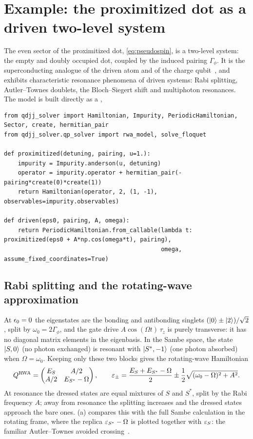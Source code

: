\chapter{Example: the proximitized dot as a driven two-level system}\label{ch:ex-tls}

The even sector of the proximitized dot, \cref{eq:pseudospin}, is a two-level system: the
empty and doubly occupied dot, coupled by the induced pairing $\Gamma_\phi$. It is the
superconducting analogue of the driven atom and of the charge
qubit~\cite{nakamura1999coherent,nakamura2001rabi,zazunov2003andreev,janvier2015coherent},
and exhibits characteristic resonance phenomena of driven systems: Rabi splitting,
Autler--Townes doublets, the Bloch--Siegert shift and multiphoton resonances. The model is
built directly as a ,

\begin{lstlisting}
from qdjj_solver import Hamiltonian, Impurity, PeriodicHamiltonian, Sector, create, hermitian_pair
from qdjj_solver.qp_solver import rwa_model, solve_floquet

def proximitized(detuning, pairing, u=1.):
    impurity = Impurity.anderson(u, detuning)
    operator = impurity.operator + hermitian_pair(-pairing*create(0)*create(1))
    return Hamiltonian(operator, 2, (1, -1), observables=impurity.observables)

def driven(eps0, pairing, A, omega):
    return PeriodicHamiltonian.from_callable(lambda t: proximitized(eps0 + A*np.cos(omega*t), pairing),
                                             omega, assume_fixed_coordinates=True)
\end{lstlisting}

\section{Rabi splitting and the rotating-wave approximation}

At $\epsilon_0=0$ the eigenstates are the bonding and antibonding singlets
$(\lvert 0\rangle\pm\lvert 2\rangle)/\sqrt2$, split by $\omega_0=2\Gamma_\phi$, and the gate drive
$A\cos(\Omega t)\,\tau_z$ is purely transverse: it has no diagonal matrix elements in the
eigenbasis. In the Sambe space, the state $\lvert S,0\rangle$ (no photon exchanged) is resonant with
$\lvert S^*,-1\rangle$ (one photon absorbed) when $\Omega=\omega_0$. Keeping only these two blocks
gives the rotating-wave Hamiltonian
\begin{equation}
  Q^{\mathrm{RWA}}=\begin{pmatrix} E_S & A/2\\ A/2 & E_{S^*}-\Omega\end{pmatrix},
  \qquad \varepsilon_\pm=\frac{E_S+E_{S^*}-\Omega}2\pm\frac12\sqrt{(\omega_0-\Omega)^2+A^2}.
\end{equation}
At resonance the dressed states are equal mixtures of $S$ and $S^*$, split by the Rabi
frequency $A$; away from resonance the splitting increases and the dressed states approach the bare
ones. (a) compares this with the full Sambe calculation in the rotating
frame, where the replica $\varepsilon_{S^*}-\Omega$ is plotted together with $\varepsilon_S$: the familiar
Autler--Townes avoided crossing~\cite{autler1955stark,cohentannoudji1977dressed}.

